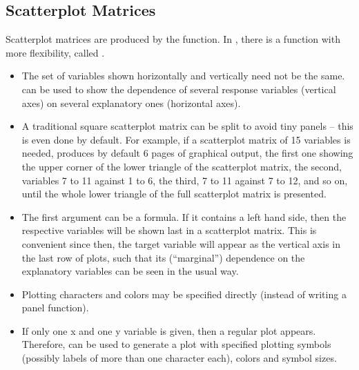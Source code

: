 \documentclass[11pt]{article}
\begin{document}
\subsection{Scatterplot Matrices}
Scatterplot matrices are produced by the  function.
In , there is a function with more flexibility, called
.
\begin{itemize}
\item 
  The set of variables shown horizontally and vertically need not be the
  same.  can be used to show the dependence of several 
  response variables (vertical axes) on several explanatory ones
  (horizontal axes).
\item
  A traditional square scatterplot matrix can be split to avoid
  tiny panels -- this is even done by default. For example, if 
  a scatterplot matrix of 15 variables is needed, 
   produces by default 6 pages of graphical output,
  the first one showing the %
  upper corner of the lower triangle of the scatterplot matrix,
  the second, variables 7 to 11 against 1 to 6, the third, 
  7 to 11 against 7 to 12, and so on, until the whole lower triangle
  of the full scatterplot matrix is presented.
\item
  The first argument can be a formula. If it contains a left hand side,
  then the respective variables will be shown last in a scatterplot
  matrix. This is convenient since then, the target variable will appear as
  the vertical axis in the last row of plots, such that its (``marginal'')
  dependence on the explanatory variables can be seen in the usual way.
\item
  Plotting characters and colors may be specified directly (instead of 
  writing a panel function).
\item
  If only one x and one y variable is given, then a regular plot appears.
  Therefore,  can be used to generate a plot with specified
  plotting symbols (possibly labels of more than one character each),
  colors and symbol sizes.
\end{itemize}
\end{document}
